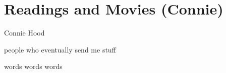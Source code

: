 \chapter{Readings and Movies (Connie)}

\begin{authors}
	Connie Hood
\end{authors}

\begin{authors}
	people who eventually send me stuff
\end{authors}

words words words




